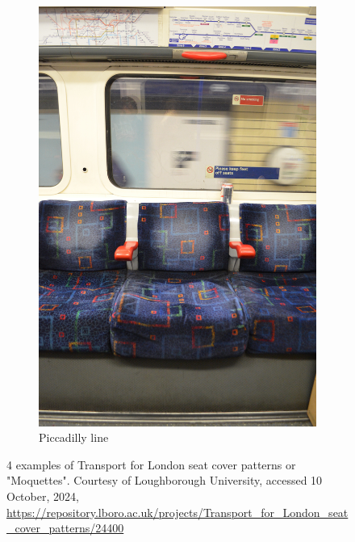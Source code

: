 \begin{figure}[H]
\begin{subfigure}[b]{0.22\textwidth}
        \includegraphics[width=\textwidth]{guidance-example-section/images/rathbone2017piccadilly.jpg}
        \caption{Piccadilly line \parencite{rathbone2017piccadilly}}
        \label{fig:rathbone2017piccadilly}
    \end{subfigure}
    \caption{4 examples of Transport for London seat cover patterns or "Moquettes". Courtesy of Loughborough University, accessed 10 October, 2024, \url{https://repository.lboro.ac.uk/projects/Transport_for_London_seat_cover_patterns/24400}}
    \label{fig:rathbone2017}
\end{figure}